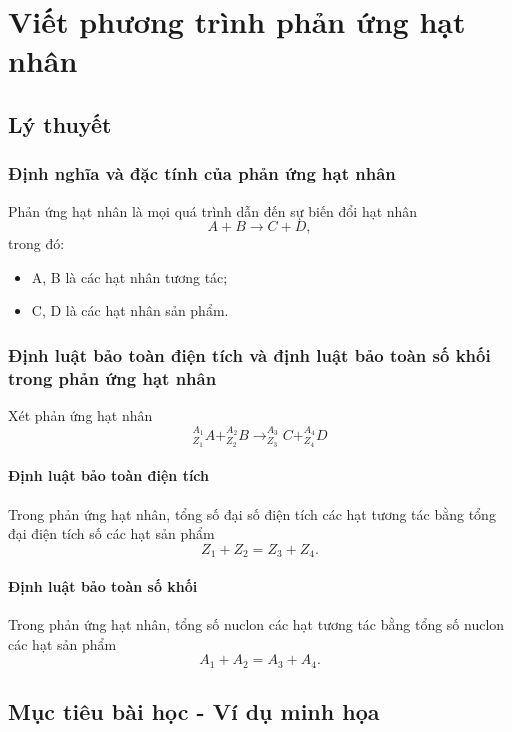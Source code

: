 \chapter[Viết phương trình phản ứng hạt nhân]{Viết phương trình phản ứng hạt nhân}
\section{Lý thuyết}

\subsection{Định nghĩa và đặc tính của phản ứng hạt nhân}
Phản ứng hạt nhân là mọi quá trình dẫn đến sự biến đổi hạt nhân
\begin{equation}
	A+B\rightarrow C+D,
\end{equation}
trong đó:
\begin{itemize}
	\item A, B là các hạt nhân tương tác;
	\item C, D là các hạt nhân sản phẩm.
\end{itemize}

\subsection{Định luật bảo toàn điện tích và định luật bảo toàn số khối trong phản ứng hạt nhân}
Xét phản ứng hạt nhân
\begin{equation}
	^{A_1}_{Z_1}A + ^{A_2}_{Z_2}B \rightarrow ^{A_3}_{Z_3}C + ^{A_4}_{Z_4}D
\end{equation}
\subsubsection{Định luật bảo toàn điện tích}
Trong phản ứng hạt nhân, tổng số đại số điện tích các hạt tương tác bằng tổng đại điện tích số các hạt sản phẩm
\begin{equation}
	Z_1+Z_2=Z_3+Z_4.
\end{equation}
\subsubsection{Định luật bảo toàn số khối}
Trong phản ứng hạt nhân, tổng số nuclon các hạt tương tác bằng tổng số nuclon các hạt sản phẩm
\begin{equation}
	A_1+A_2=A_3+A_4.
\end{equation}

\section{Mục tiêu bài học - Ví dụ minh họa}

